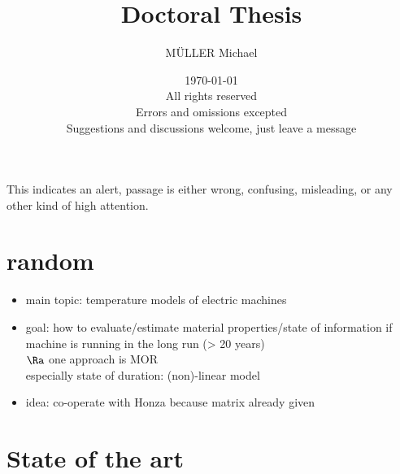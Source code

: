 \documentclass{scrartcl}
\begin{document}
\title{Doctoral Thesis}
\author{\uppercase{Müller} Michael}
\date{\today \\ All rights reserved\tcr \\ \centering Errors and omissions excepted \\ Suggestions and discussions welcome, just leave a message}

\maketitle
\printbibliography


\alert{This indicates an alert, passage is either wrong, confusing, misleading, or any other kind of high attention.}


\section{random}

\begin{itemize}
	\item main topic: temperature models of electric machines
	\item goal: how to evaluate/estimate material properties/state of information if machine is running in the long run (> 20 years)\\
	$\Ra$ one approach is MOR \\
	especially state of duration: (non)-linear model
	\item idea: co-operate with Honza because matrix already given
\end{itemize}







\section{State of the art}
\end{document}
